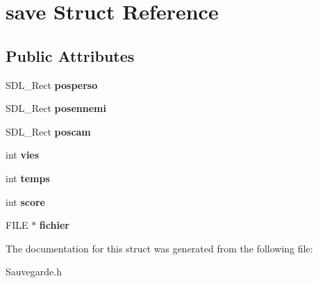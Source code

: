 \hypertarget{structsave}{}\section{save Struct Reference}
\label{structsave}
\subsection*{Public Attributes}
\begin{DoxyCompactItemize}
\item 
\mbox{\label{structsave_a0c57ba62cb2556c435041b766398d6f4}} 
S\+D\+L\+\_\+\+Rect {\bfseries posperso}
\item 
\mbox{\label{structsave_a950c5e19a6cc5289b16c0ce885913aae}} 
S\+D\+L\+\_\+\+Rect {\bfseries posennemi}
\item 
\mbox{\label{structsave_ad915379ec11968effd8d89b92d082267}} 
S\+D\+L\+\_\+\+Rect {\bfseries poscam}
\item 
\mbox{\label{structsave_ae2c9f4bb2a8aea30342378169f3a6f63}} 
int {\bfseries vies}
\item 
\mbox{\label{structsave_add43f536fd076c8824e164a413927660}} 
int {\bfseries temps}
\item 
\mbox{\label{structsave_a9963249edd7dbf9c9d303faa18281a5a}} 
int {\bfseries score}
\item 
\mbox{\label{structsave_a6ae10d4be99d8f2c2063079c46feaac4}} 
F\+I\+LE $\ast$ {\bfseries fichier}
\end{DoxyCompactItemize}


The documentation for this struct was generated from the following file\+:\begin{DoxyCompactItemize}
\item 
Sauvegarde.\+h\end{DoxyCompactItemize}

